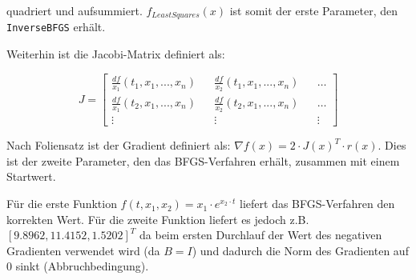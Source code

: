 \documentclass[a4paper, 12pt]{report}
\begin{document}
quadriert und aufsummiert. $f_{LeastSquares}(x)$ ist somit der erste Parameter, den\\
\lstinline[basicstyle=\ttfamily\color{black}]|InverseBFGS| erhält.\par
Weiterhin ist die Jacobi-Matrix definiert als:

$$J = \begin{bmatrix}\frac{df}{x_1}(t_1, x_1, ..., x_n) && \frac{df}{x_2}(t_1, x_1, ..., x_n) && \ldots\\
            \frac{df}{x_1}(t_2, x_1, ..., x_n) && \frac{df}{x_2}(t_2, x_1, ..., x_n) && \ldots\\
            \vdots && \vdots && \vdots\end{bmatrix}$$

Nach Foliensatz ist der Gradient definiert als: $\nabla f(x) = 2\cdot J(x)^T\cdot r(x)$. Dies ist der zweite Parameter, den
das BFGS-Verfahren erhält, zusammen mit einem Startwert.\par
Für die erste Funktion $f(t, x_1, x_2) = x_1\cdot e^{x_2\cdot t}$ liefert das BFGS-Verfahren den korrekten Wert. Für die
zweite Funktion liefert es jedoch z.B.\\
$[9.8962, 11.4152, 1.5202]^T$ da beim ersten Durchlauf der Wert des negativen Gradienten
verwendet wird (da $B = I$) und dadurch die Norm des Gradienten auf 0 sinkt (Abbruchbedingung).
\end{document}
